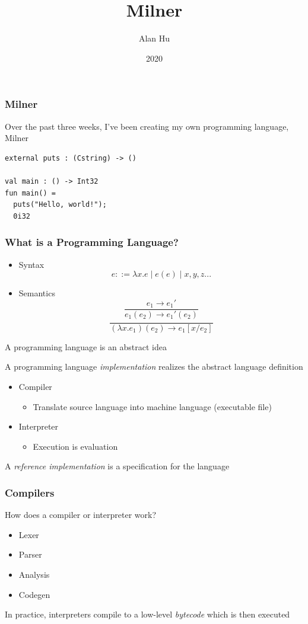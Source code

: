 \documentclass{beamer}
\title{Milner}
\author{Alan Hu}
\date{2020}
\begin{document}
\frame{\titlepage}

\begin{frame}[fragile]
  \frametitle{Milner}
  Over the past three weeks, I've been creating my own programming language,
  Milner

\begin{verbatim}
external puts : (Cstring) -> ()

val main : () -> Int32
fun main() =
  puts("Hello, world!");
  0i32
\end{verbatim}
\end{frame}

\begin{frame}
  \frametitle{What is a Programming Language?}
  \begin{itemize}
    \pause
  \item Syntax
    $$
    e ::= \lambda x.e \mid e(e) \mid x, y, z...
    $$
    \pause
  \item Semantics
    $$
    \frac{e_1 \longrightarrow e_1'}{e_1(e_2) \longrightarrow e_1'(e_2)}
    $$
    $$
    \frac{}{(\lambda x.e_1)(e_2) \longrightarrow e_1[x/e_2]}
    $$
  \end{itemize}
  \pause
  A programming language is an abstract idea
\end{frame}

\begin{frame}
  A programming language \textit{implementation} realizes the abstract language
  definition
  \begin{itemize}
    \pause
  \item Compiler
    \begin{itemize}
      \pause
      \item Translate source language into machine language (executable file)
    \end{itemize}
    \pause
  \item Interpreter
    \begin{itemize}
      \pause
    \item Execution is evaluation
    \end{itemize}
  \end{itemize}
  A \textit{reference implementation} is a specification for the language
\end{frame}

\begin{frame}
  \frametitle{Compilers}
  How does a compiler or interpreter work?
  \begin{itemize}
    \pause
  \item Lexer
    \pause
  \item Parser
    \pause
  \item Analysis
    \pause
  \item Codegen
  \end{itemize}
  \pause
  In practice, interpreters compile to a low-level \textit{bytecode} which is
  then executed
\end{frame}
\end{document}
